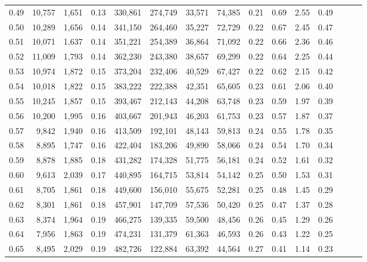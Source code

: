 \begin{tabular}{rrrrrrrrrrrrrrr}
0.49 &  10,757 &  1,651 &  0.13 &  330,861 &  274,749 &   33,571 &   74,385 &  0.21 &  0.69 &  2.55 &      0.49 \\
0.50 &  10,289 &  1,656 &  0.14 &  341,150 &  264,460 &   35,227 &   72,729 &  0.22 &  0.67 &  2.45 &      0.47 \\
0.51 &  10,071 &  1,637 &  0.14 &  351,221 &  254,389 &   36,864 &   71,092 &  0.22 &  0.66 &  2.36 &      0.46 \\
0.52 &  11,009 &  1,793 &  0.14 &  362,230 &  243,380 &   38,657 &   69,299 &  0.22 &  0.64 &  2.25 &      0.44 \\
0.53 &  10,974 &  1,872 &  0.15 &  373,204 &  232,406 &   40,529 &   67,427 &  0.22 &  0.62 &  2.15 &      0.42 \\
0.54 &  10,018 &  1,822 &  0.15 &  383,222 &  222,388 &   42,351 &   65,605 &  0.23 &  0.61 &  2.06 &      0.40 \\
0.55 &  10,245 &  1,857 &  0.15 &  393,467 &  212,143 &   44,208 &   63,748 &  0.23 &  0.59 &  1.97 &      0.39 \\
0.56 &  10,200 &  1,995 &  0.16 &  403,667 &  201,943 &   46,203 &   61,753 &  0.23 &  0.57 &  1.87 &      0.37 \\
0.57 &   9,842 &  1,940 &  0.16 &  413,509 &  192,101 &   48,143 &   59,813 &  0.24 &  0.55 &  1.78 &      0.35 \\
0.58 &   8,895 &  1,747 &  0.16 &  422,404 &  183,206 &   49,890 &   58,066 &  0.24 &  0.54 &  1.70 &      0.34 \\
0.59 &   8,878 &  1,885 &  0.18 &  431,282 &  174,328 &   51,775 &   56,181 &  0.24 &  0.52 &  1.61 &      0.32 \\
0.60 &   9,613 &  2,039 &  0.17 &  440,895 &  164,715 &   53,814 &   54,142 &  0.25 &  0.50 &  1.53 &      0.31 \\
0.61 &   8,705 &  1,861 &  0.18 &  449,600 &  156,010 &   55,675 &   52,281 &  0.25 &  0.48 &  1.45 &      0.29 \\
0.62 &   8,301 &  1,861 &  0.18 &  457,901 &  147,709 &   57,536 &   50,420 &  0.25 &  0.47 &  1.37 &      0.28 \\
0.63 &   8,374 &  1,964 &  0.19 &  466,275 &  139,335 &   59,500 &   48,456 &  0.26 &  0.45 &  1.29 &      0.26 \\
0.64 &   7,956 &  1,863 &  0.19 &  474,231 &  131,379 &   61,363 &   46,593 &  0.26 &  0.43 &  1.22 &      0.25 \\
0.65 &   8,495 &  2,029 &  0.19 &  482,726 &  122,884 &   63,392 &   44,564 &  0.27 &  0.41 &  1.14 &      0.23 \\

\end{tabular}
